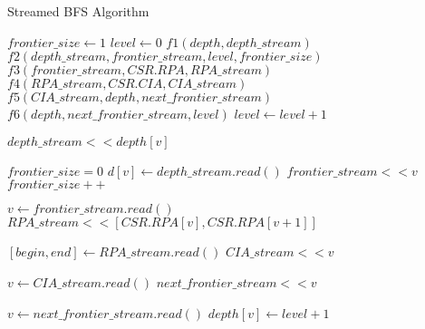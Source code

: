 \begin{algorithm}
	\caption{Streamed BFS Algorithm} \label{alg:bfs-stream}
    \small
	\begin{algorithmic}[1]
        \State $frontier\_size \gets 1$
        \State $level \gets 0$
        \State $f1(depth, depth\_stream)$
        \State $f2(depth\_stream, frontier\_stream, level, frontier\_size)$ 
        \State $f3(frontier\_stream, CSR.RPA, RPA\_stream)$
        \State $f4(RPA\_stream, CSR.CIA, CIA\_stream)$ 
        \State $f5(CIA\_stream, depth, next\_frontier\_stream)$
        \State $f6(depth, next\_frontier\_stream, level)$
        \State $level \gets level + 1$
        \EndWhile
        \EndProcedure
        \State

        \State $depth\_stream << depth[v]$
        \EndFor
        \EndProcedure

        \State $frontier\_size = 0$
        \State $d[v] \gets depth\_stream.read()$
        \State $frontier\_stream << v$
        \State $frontier\_size++$
        \EndIf
        \EndFor
        \EndProcedure

        \State $v \gets frontier\_stream.read()$
        \State $RPA\_stream << [CSR.RPA[v], CSR.RPA[v+1]]$
        \EndWhile
        \EndProcedure

        \State $[begin, end] \gets RPA\_stream.read()$
        \State $CIA\_stream << v$
        \EndFor
        \EndWhile
        \EndProcedure

        \State $v \gets CIA\_stream.read()$
        \State $next\_frontier\_stream << v$
        \EndIf
        \EndWhile
        \EndProcedure

        \State $v \gets next\_frontier\_stream.read()$
        \State $depth[v] \gets level + 1$
        \EndWhile
        \EndProcedure

    \end{algorithmic}
\end{algorithm}

